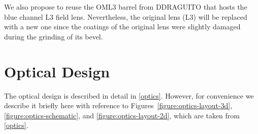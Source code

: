 \documentclass{report}
\begin{document}
We also propose to reuse the OML3 barrel from DDRAGUITO that hosts the blue channel L3 field lens. Nevertheless, the original lens (L3) will be replaced with a new one since the coatings of the original lens were slightly damaged during the grinding of its bevel.







\section{Optical Design}

The optical design is described in detail in \ref{optics}. However, for convenience we describe it briefly here with reference to Figures~\ref{figure:optics-layout-3d}, \ref{figure:optics-schematic},  and \ref{figure:optics-layout-2d}, which are taken from \ref{optics}.
\end{document}
